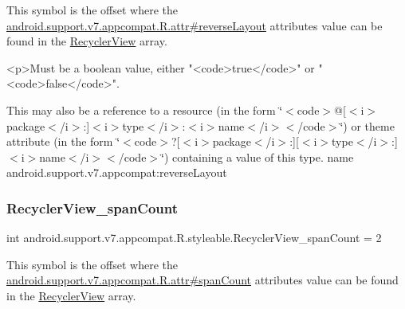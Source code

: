 This symbol is the offset where the \hyperlink{classandroid_1_1support_1_1v7_1_1appcompat_1_1R_1_1attr_acd83a3fdb876fe9d37c12f157cf90972}{android.\+support.\+v7.\+appcompat.\+R.\+attr\#reverse\+Layout} attribute\textquotesingle{}s value can be found in the \hyperlink{classandroid_1_1support_1_1v7_1_1appcompat_1_1R_1_1styleable_ae3744efe286beea8d85d9fa344fa70df}{Recycler\+View} array.

\begin{DoxyVerb}      <p>Must be a boolean value, either "<code>true</code>" or "<code>false</code>".
\end{DoxyVerb}
 

This may also be a reference to a resource (in the form \char`\"{}$<$code$>$@\mbox{[}$<$i$>$package$<$/i$>$\+:\mbox{]}$<$i$>$type$<$/i$>$\+:$<$i$>$name$<$/i$>$$<$/code$>$\char`\"{}) or theme attribute (in the form \char`\"{}$<$code$>$?\mbox{[}$<$i$>$package$<$/i$>$\+:\mbox{]}\mbox{[}$<$i$>$type$<$/i$>$\+:\mbox{]}$<$i$>$name$<$/i$>$$<$/code$>$\char`\"{}) containing a value of this type.  name android.\+support.\+v7.\+appcompat\+:reverse\+Layout \mbox{\label{classandroid_1_1support_1_1v7_1_1appcompat_1_1R_1_1styleable_ac99c387843c4ab5e1f26911d0baac306}} 
\subsubsection{\texorpdfstring{Recycler\+View\+\_\+span\+Count}{RecyclerView\_spanCount}}
{\footnotesize\ttfamily int android.\+support.\+v7.\+appcompat.\+R.\+styleable.\+Recycler\+View\+\_\+span\+Count = 2\hspace{0.3cm}{\ttfamily [static]}}

This symbol is the offset where the \hyperlink{classandroid_1_1support_1_1v7_1_1appcompat_1_1R_1_1attr_a09556cbb116dcc82ef3b65a9d4b55d8c}{android.\+support.\+v7.\+appcompat.\+R.\+attr\#span\+Count} attribute\textquotesingle{}s value can be found in the \hyperlink{classandroid_1_1support_1_1v7_1_1appcompat_1_1R_1_1styleable_ae3744efe286beea8d85d9fa344fa70df}{Recycler\+View} array.

